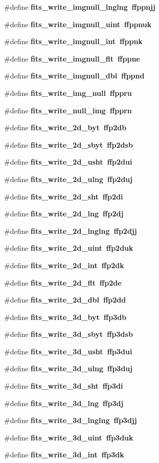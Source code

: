 \begin{CompactItemize}
\#define \bf{fits\_\-write\_\-imgnull\_\-lnglng}~ffppnjj
\item 
\#define \bf{fits\_\-write\_\-imgnull\_\-uint}~ffppnuk
\item 
\#define \bf{fits\_\-write\_\-imgnull\_\-int}~ffppnk
\item 
\#define \bf{fits\_\-write\_\-imgnull\_\-flt}~ffppne
\item 
\#define \bf{fits\_\-write\_\-imgnull\_\-dbl}~ffppnd
\item 
\#define \bf{fits\_\-write\_\-img\_\-null}~ffppru
\item 
\#define \bf{fits\_\-write\_\-null\_\-img}~ffpprn
\item 
\#define \bf{fits\_\-write\_\-2d\_\-byt}~ffp2db
\item 
\#define \bf{fits\_\-write\_\-2d\_\-sbyt}~ffp2dsb
\item 
\#define \bf{fits\_\-write\_\-2d\_\-usht}~ffp2dui
\item 
\#define \bf{fits\_\-write\_\-2d\_\-ulng}~ffp2duj
\item 
\#define \bf{fits\_\-write\_\-2d\_\-sht}~ffp2di
\item 
\#define \bf{fits\_\-write\_\-2d\_\-lng}~ffp2dj
\item 
\#define \bf{fits\_\-write\_\-2d\_\-lnglng}~ffp2djj
\item 
\#define \bf{fits\_\-write\_\-2d\_\-uint}~ffp2duk
\item 
\#define \bf{fits\_\-write\_\-2d\_\-int}~ffp2dk
\item 
\#define \bf{fits\_\-write\_\-2d\_\-flt}~ffp2de
\item 
\#define \bf{fits\_\-write\_\-2d\_\-dbl}~ffp2dd
\item 
\#define \bf{fits\_\-write\_\-3d\_\-byt}~ffp3db
\item 
\#define \bf{fits\_\-write\_\-3d\_\-sbyt}~ffp3dsb
\item 
\#define \bf{fits\_\-write\_\-3d\_\-usht}~ffp3dui
\item 
\#define \bf{fits\_\-write\_\-3d\_\-ulng}~ffp3duj
\item 
\#define \bf{fits\_\-write\_\-3d\_\-sht}~ffp3di
\item 
\#define \bf{fits\_\-write\_\-3d\_\-lng}~ffp3dj
\item 
\#define \bf{fits\_\-write\_\-3d\_\-lnglng}~ffp3djj
\item 
\#define \bf{fits\_\-write\_\-3d\_\-uint}~ffp3duk
\item 
\#define \bf{fits\_\-write\_\-3d\_\-int}~ffp3dk
\item 

\end{CompactItemize}
